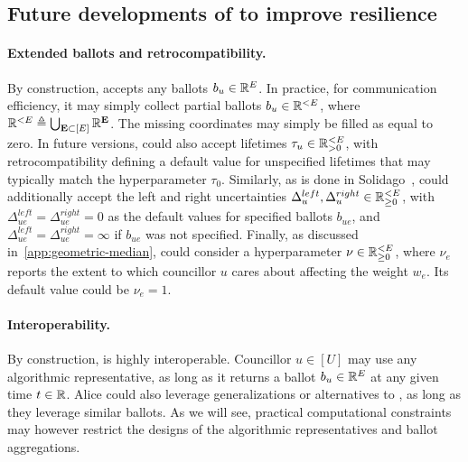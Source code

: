 

\subsection{Future developments of \Veche{} to improve resilience}
\label{sec:interoperability}

\paragraph{Extended ballots and retrocompatibility.}
By construction, \Veche{} accepts any ballots $b_u \in \mathbb R^E$.
In practice, for communication efficiency,
it may simply collect partial ballots $b_u \in \mathbb R^{<E}$,
where $\mathbb R^{< E} \triangleq \bigcup_{{\bf E} \subset [E]} \mathbb R^{\bf E}$.
The missing coordinates may simply be filled as equal to zero.
In future versions, 
\Veche{} could also accept lifetimes $\tau_u \in \mathbb R^{<E}_{>0}$,
with retrocompatibility defining a default value for unspecified lifetimes
that may typically match the hyperparameter $\tau_0$.
Similarly, as is done in Solidago~\cite{hoang2022solidago},
\Veche{} could additionally accept 
the left and right uncertainties
$\Delta_u^{left}, \Delta_u^{right} \in \mathbb R^{<E}_{\geq 0}$,
with $\Delta_{ue}^{left} = \Delta_{ue}^{right} = 0$ as the default values
for specified ballots $b_{ue}$,
and $\Delta_{ue}^{left} = \Delta_{ue}^{right} = \infty$ 
if $b_{ue}$ was not specified.
Finally, as discussed in~\ref{app:geometric-median},
\Veche{} could consider a hyperparameter $\nu \in \mathbb R^{< E}_{\geq 0}$,
where $\nu_e$ reports the extent to which councillor $u$ cares about affecting
the weight $w_e$.
Its default value could be $\nu_e = 1$.

\paragraph{Interoperability.}
By construction, \Veche{} is highly interoperable.
Councillor $u \in [U]$ may use any algorithmic representative,
as long as it returns a ballot $b_u \in \mathbb R^E$ 
at any given time $t \in \mathbb R$.
Alice could also leverage generalizations or alternatives to \Veche{},
as long as they leverage similar ballots.
As we will see, practical computational constraints may however restrict
the designs of the algorithmic representatives and ballot aggregations.

